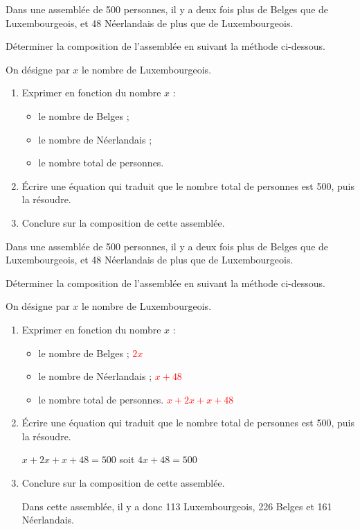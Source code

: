 \begin{exercice*}
    Dans une assemblée de 500 personnes, il y a deux fois plus de Belges que de Luxembourgeois, 
    et 48 Néerlandais de plus que de Luxembourgeois. 
    
    Déterminer la composition de l'assemblée en suivant la méthode ci-dessous. 
    
    On désigne par $x$ le nombre de Luxembourgeois.
    \begin{enumerate}
        \item Exprimer en fonction du nombre $x$ :
        \begin{itemize}
            \item le nombre de Belges ;
            \item le nombre de Néerlandais ;
            \item le nombre total de personnes.
        \end{itemize}
        \item Écrire une équation qui traduit que le nombre total de personnes est 500, puis la résoudre.
        \item Conclure sur la composition de cette assemblée.
    \end{enumerate}
\end{exercice*}
\begin{corrige}
    Dans une assemblée de 500 personnes, il y a deux fois plus de Belges que de Luxembourgeois, 
    et 48 Néerlandais de plus que de Luxembourgeois. 
    
    Déterminer la composition de l'assemblée en suivant la méthode ci-dessous. 
    
    On désigne par $x$ le nombre de Luxembourgeois.

    \begin{enumerate}
        \item Exprimer en fonction du nombre $x$ :
        \begin{itemize}
            \item le nombre de Belges ; \textcolor{red}{$2x$}
            \item le nombre de Néerlandais ; \textcolor{red}{$x+48$}
            \item le nombre total de personnes. \textcolor{red}{$x+2x+x+48$}
        \end{itemize}
        \item Écrire une équation qui traduit que le nombre total de personnes est 500, puis la résoudre.
        
        {\color{red} $x+2x+x+48=500$ soit $4x+48=500$
        
        }
        \item Conclure sur la composition de cette assemblée.
        
        {\color{red} Dans cette assemblée, il y a donc 113 Luxembourgeois, 226 Belges et 161 Néerlandais.}
    \end{enumerate}
\end{corrige}

